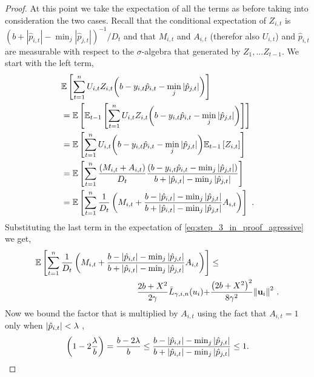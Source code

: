 {\begin{proof}
At this point we take  the expectation of all the terms as before taking into consideration the two cases.  Recall that the conditional expectation of $Z_{i,t}$ is
$(b+|\hat{p}_{i,t}|-\min_j| \hat{p}_{j,t}|)^{-1}/D_{t}$
and that $M_{i,t}$ and $A_{i,t}$ (therefor also $U_{i,t}$) and $\hat{p}_{i,t}$ are measurable with respect to the $\sigma$-algebra that generated by $Z_1,...Z_{t-1}$. 
We start with the left term,
\begin{align*}
\begin{split}
&\mathbb{E}\left[{\sum_{t=1}^{n}U_{i,t}Z_{i,t}{\left({b-y_{i,t}\hat{p}_{i,t}-\min_{j}{\left\vert{ \hat{p}_{j,t}}\right\vert}}\right)}}\right]\\
&=\mathbb{E}\left[{\mathbb{E}_{t-1}\left[{{\sum_{t=1}^{n}{U_{i,t}Z_{i,t}{\left(b-y_{i,t}\hat{p}_{i,t}-\min_{j}{\left\vert{\hat{p}_{j,t}}\right\vert}\right)}}}}\right]}\right] \\
&=\mathbb{E}\left[{{\sum_{t=1}^{n}U_{i,t}{\left({b -y_{i,t}\hat{p}_{i,t}}-\min_{j}{\left\vert \hat{p}_{j,t} \right\vert}\right)}\mathbb{E}_{t-1}\left[{ Z_{i,t}}\right]}}\right]\\
&=\mathbb{E}\left[{\sum_{t=1}^{n}\frac{\left({M_{i,t}+A_{i,t}}\right)}{D_{t}}\frac{\left({b -y_{i,t}\hat{p}_{i,t}-\min_{j}\left\vert{\hat{p}_{j,t}}\right\vert}\right)}{b+\left\vert{\hat{p}_{i,t}}\right\vert-\min_{j}{\left\vert{\hat{p}_{j,t}}\right\vert}}}\right]\\
&=\mathbb{E}\left[{\sum_{t=1}^{n}{\frac{1}{D_{t}}\left({M_{i,t}+\frac{b-\left\vert{\hat{p}_{i,t}}\right\vert-\min_{j}{\left\vert{\hat{p}_{j,t}}\right\vert }}{b+\left\vert{\hat{p}_{i,t}}\right\vert-\min_{j}{\left\vert{\hat{p}_{j,t}}\right\vert}}A_{i,t} }\right)}}\right]~.
\end{split}
\end{align*}
Substituting the last term in the expectation of
\eqref{eq:step_3_in_proof_agressive} we get,
\begin{equation}
\begin{split}
\mathbb{E}\left[ \sum_{t=1}^{n}{\frac{1}{D_{t}}}\left({M_{i,t}+\frac{b-\left\vert{\hat{p}_{i,t}}\right\vert-\min_{j}{\left\vert{\hat{p}_{j,t}}\right\vert }}{b+\left\vert{\hat{p}_{i,t}}\right\vert-\min_{j}{\left\vert{\hat{p}_{j,t}}\right\vert}}A_{i,t} }\right) \right]
&\le \\ \frac{2b+X^2}{2\gamma}{\bar
  L}_{\gamma,i,n}(u_i)+&\frac{\left({2b+X^2}\right)^2}{8{\gamma}^2}{\left\Vert
    \mathbf{u}_{i} \right\Vert}^2~.
\label{step_3_in_proof_aggressive}
\end{split}
\end{equation} 
Now we bound the factor that is multiplied by $A_{i,t}$ using the fact that $A_{i,t}=1$ only when 
$\left\vert{\hat{p}_{i,t}}\right\vert<\lambda$ ,
\begin{equation}
\paren{1-2\frac{\lambda}{b}}=\frac{b-2\lambda}{b} \le\frac{b-\abs{\hat{p}_{i,t}}-\min_{j}{\abs{\hat{p}_{j,t}} }}{b+\abs{\hat{p}_{i,t}}-\min_{j}{\abs{\hat{p}_{j,t}}}}\le1.

\end{equation}
\end{proof}}
